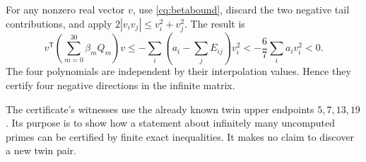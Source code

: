 For any nonzero real vector \(v\), use \eqref{cq:betabound}, discard the
two negative tail contributions, and apply
\(2|v_i v_j|\leq v_i^2+v_j^2\). The result is
\[
 v^{\mathsf T}\left(\sum_{m=0}^{30}\beta_mQ_m\right)v
 \leq-\sum_i\left(a_i-\sum_jE_{ij}\right)v_i^2
 <-\frac67\sum_i a_i v_i^2<0 .
\]
The four polynomials are independent by their interpolation values.
Hence they certify four negative directions in the infinite matrix.

The certificate's witnesses use the already known twin upper endpoints
\(5,7,13,19\). Its purpose is to show how a statement about infinitely
many uncomputed primes can be certified by finite exact inequalities.
It makes no claim to discover a new twin pair.
